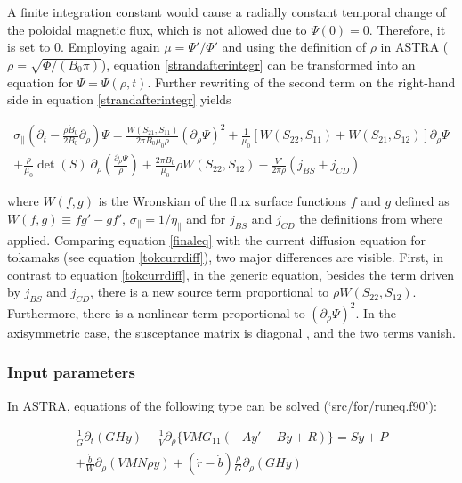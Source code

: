 A finite integration constant would cause a radially constant temporal change of the poloidal magnetic flux, which is not allowed due to $\Psi(0)=0$. Therefore, it is set to 0. Employing again $\mu = \Psi'/\Phi'$ and using the definition of $\rho$ in ASTRA ($\rho = \sqrt{\Phi/(B_0\pi)}$), equation \ref{strandafterintegr} can be transformed into an equation for $\Psi=\Psi(\rho,t)$. Further rewriting of the second term on the right-hand side in equation \ref{strandafterintegr} yields

\begin{eqnarray} \label{finaleq}
\sigma_\parallel \left( \partial_t - \frac{\rho \dot{B}_0}{2B_0} \partial_\rho \right) \Psi = \frac{W(S_{21},S_{11})}{2\pi B_0\mu_0 \rho} \left(\partial_\rho \Psi\right)^2 + \frac{1}{\mu_0} \left[ W(S_{22},S_{11}) + W(S_{21},S_{12}) \right]\partial_\rho \Psi
\\
 + \frac{\rho}{\mu_0} \det(S) \ \partial_\rho\left(\frac{\partial_\rho \Psi}{\rho} \right) + \frac{2\pi B_0}{\mu_0} \rho W(S_{22},S_{12}) - \frac{V'}{2\pi\rho} \left(j_{BS}+j_{CD} \right) \nonumber
\end{eqnarray}

where $W(f,g)$ is the Wronskian of the flux surface functions $f$ and $g$ defined as $W(f,g) \equiv fg' - gf'$, $\sigma_\parallel = 1/\eta_\parallel$ and for $j_{BS}$ and $j_{CD}$ the definitions from \cite{ASTRAmanual} where applied. Comparing equation \ref{finaleq} with the current diffusion equation for tokamaks (see equation \ref{tokcurrdiff}), two major differences are visible. First, in contrast to equation \ref{tokcurrdiff}, in the generic equation, besides the term driven by $j_{BS}$ and $j_{CD}$, there is a new source term proportional to $\rho W(S_{22},S_{12})$. Furthermore, there is a nonlinear term proportional to $(\partial_\rho \Psi)^2$. In the axisymmetric case, the susceptance matrix is diagonal \cite{strand2001}, and the two terms vanish.


\subsubsection{Input parameters}

In ASTRA, equations of the following type can be solved (`src/for/runeq.f90'):

\begin{eqnarray} \label{inputscheme}
\frac{1}{G} \partial_t \left( GHy \right) + \frac{1}{V} \partial_\rho \{ VMG_{11} \left(-Ay'-By+R \right) \} = Sy + P \\
+ \frac{\dot{b}}{W} \partial_\rho \left( VMN\rho y \right) + \left(\dot{r}-\dot{b} \right) \frac{\rho}{G} \partial_\rho \left(GHy \right) \nonumber
\end{eqnarray}

